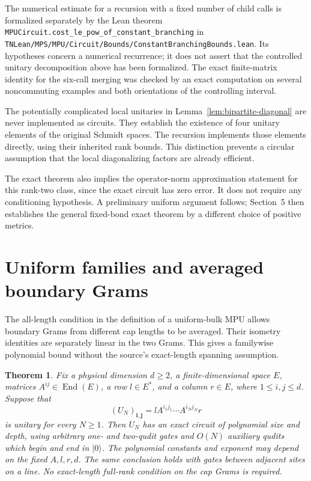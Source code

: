 \documentclass[11pt]{article}
\newtheorem{theorem}[lemma]{Theorem}
\begin{document}
The numerical estimate for a recursion with a fixed number of child
calls is formalized separately by the Lean theorem
\nolinkurl{MPUCircuit.cost_le_pow_of_constant_branching} in
\nolinkurl{TNLean/MPS/MPU/Circuit/Bounds/ConstantBranchingBounds.lean}. Its hypotheses
concern a numerical recurrence; it does not assert that the controlled
unitary decomposition above has been formalized. The exact finite-matrix
identity for the six-call merging was checked by an exact computation on
several noncommuting examples and both orientations of the controlling interval.

The potentially complicated local unitaries in
Lemma~\ref{lem:bipartite-diagonal} are never implemented as circuits.
They establish the existence of four unitary elements of the original
Schmidt spaces. The recursion implements those elements directly, using
their inherited rank bounds. This distinction prevents a circular
assumption that the local diagonalizing factors are already efficient.

The exact theorem also implies the operator-norm approximation statement
for this rank-two class, since the exact circuit has zero error. It
does not require any conditioning hypothesis. A preliminary uniform
argument follows; Section~5 then establishes the general fixed-bond
exact theorem by a different choice of positive metrics.

\section{Uniform families and averaged boundary Grams}
\label{sec:uniform-averaged-grams}

The all-length condition in the definition of a uniform-bulk MPU
allows boundary Grams from different cap lengths to be averaged.
Their isometry identities are separately linear in the two Grams.
This gives a familywise polynomial bound without the source's
exact-length spanning assumption.

\begin{theorem}\label{thm:uniform-averaged-grams}
Fix a physical dimension $d\geq2$, a finite-dimensional space $E$,
matrices $A^{ij}\in\operatorname{End}(E)$, a row $l\in E^*$, and
a column $r\in E$, where $1\leq i,j\leq d$. Suppose that
\[
 (U_N)_{\mathbf i,\mathbf j}
   =lA^{i_1j_1}\cdots A^{i_Nj_N}r
\]
is unitary for every $N\geq1$. Then $U_N$ has an exact circuit of
polynomial size and depth, using arbitrary one- and two-qudit gates
and $O(N)$ auxiliary qudits which begin and end in $|0\rangle$.
The polynomial constants and exponent may depend on the fixed
$A,l,r,d$. The same conclusion holds with gates between adjacent sites
on a line. No exact-length full-rank condition on the cap Grams
is required.
\end{theorem}
\end{document}
